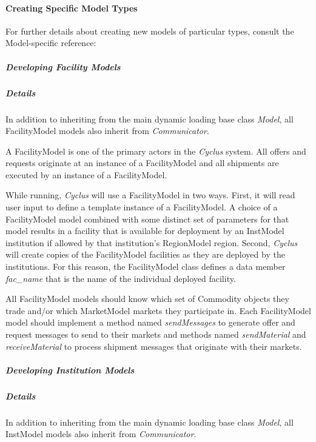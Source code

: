 \documentclass[letterpaper,10pt,english]{sphinxmanual}
\begin{document}
\paragraph{Creating Specific Model Types}
\label{devdoc/make-models/main:creating-specific-model-types}
For further details about creating new models of particular types, consult the
Model-specific reference:


\subparagraph{Developing Facility Models}
\label{devdoc/make-models/facility::doc}\label{devdoc/make-models/facility:developing-facility-models}

\subparagraph{Details}
\label{devdoc/make-models/facility:details}
In addition to inheriting from the main dynamic loading base class \emph{Model}, all
FacilityModel models also inherit from \emph{Communicator}.

A FacilityModel is one of the primary actors in the \emph{Cyclus} system.  All
offers and requests originate at an instance of a FacilityModel and all
shipments are executed by an instance of a FacilityModel.

While running, \emph{Cyclus} will use a FacilityModel in two ways.  First, it will
read user input to define a template instance of a FacilityModel.  A choice of
a FacilityModel model combined with some distinct set of parameters for that
model results in a facility that is available for deployment by an InstModel
institution if allowed by that institution's RegionModel region.  Second,
\emph{Cyclus} will create copies of the FacilityModel facilities as they are
deployed by the institutions.  For this reason, the FacilityModel class defines
a data member \emph{fac\_name} that is the name of the individual deployed facility.

All FacilityModel models should know which set of Commodity objects they trade
and/or which MarketModel markets they participate in.  Each FacilityModel model
should implement a method named \emph{sendMessages} to generate offer and request
messages to send to their markets and methods named \emph{sendMaterial} and
\emph{receiveMaterial} to process shipment messages that originate with their
markets.


\subparagraph{Developing Institution Models}
\label{devdoc/make-models/institution::doc}\label{devdoc/make-models/institution:developing-institution-models}

\subparagraph{Details}
\label{devdoc/make-models/institution:details}
In addition to inheriting from the main dynamic loading base class \emph{Model}, all
InstModel models also inherit from \emph{Communicator}.
\end{document}
